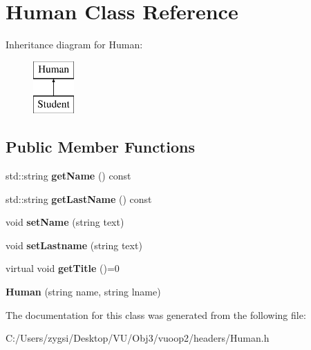 \hypertarget{class_human}{}\section{Human Class Reference}
\label{class_human}
Inheritance diagram for Human\+:\begin{figure}[H]
\begin{center}
\leavevmode
\includegraphics[height=2.000000cm]{class_human}
\end{center}
\end{figure}
\subsection*{Public Member Functions}
\begin{DoxyCompactItemize}
\item 
\mbox{\label{class_human_ac6e07d3c96936cc5ca85773d92f25d07}} 
std\+::string {\bfseries get\+Name} () const
\item 
\mbox{\label{class_human_a71136bb226a52a8521d63d14abc2bc71}} 
std\+::string {\bfseries get\+Last\+Name} () const
\item 
\mbox{\label{class_human_a9a0861ff6500e58431f06f302e930e24}} 
void {\bfseries set\+Name} (string text)
\item 
\mbox{\label{class_human_a66fd88a7b0ad24bcc73a7b8d11fad74a}} 
void {\bfseries set\+Lastname} (string text)
\item 
\mbox{\label{class_human_aab3058fde2dd67ecc2b2177921c76f8c}} 
virtual void {\bfseries get\+Title} ()=0
\item 
\mbox{\label{class_human_a85d38b2e0887bbff7c93965125399c03}} 
{\bfseries Human} (string name, string lname)
\end{DoxyCompactItemize}


The documentation for this class was generated from the following file\+:\begin{DoxyCompactItemize}
\item 
C\+:/\+Users/zygsi/\+Desktop/\+V\+U/\+Obj3/vuoop2/headers/Human.\+h\end{DoxyCompactItemize}
